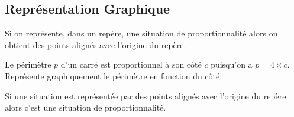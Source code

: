 \documentclass[a4paper,10pt]{report}
\begin{document}
\subsection{Représentation Graphique}

\begin{prop}
Si on représente, dans un repère, une situation de proportionnalité alors on obtient des points alignés avec l'origine du repère.
\end{prop}

\begin{ex}
Le périmètre $p$ d'un carré est proportionnel à son côté $c$ puisqu'on a $p=4 \times c$.
Représente graphiquement le périmètre en fonction du côté.

\noindent\grandscarreaux{\linewidth}{3.2cm}
\end{ex}

\begin{prop}
Si une situation est représentée par des points alignés avec l'origine du repère alors c'est une situation de proportionnalité.
\end{prop}
\end{document}
